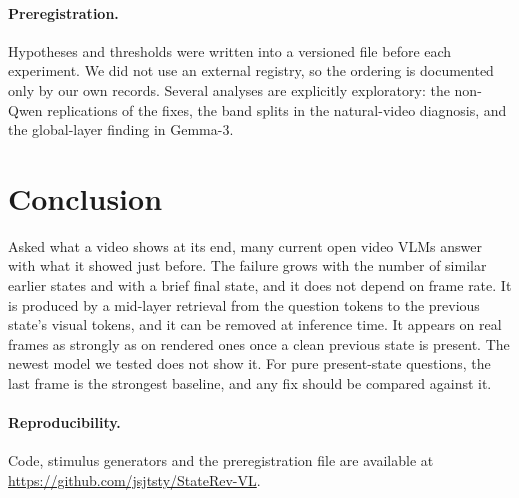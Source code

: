 \documentclass[10pt,twocolumn,letterpaper]{article}
\begin{document}
\paragraph{Preregistration.} Hypotheses and thresholds were written into a versioned file before each experiment. We did not use an external registry, so the ordering is documented only by our own records. Several analyses are explicitly exploratory: the non-Qwen replications of the fixes, the band splits in the natural-video diagnosis, and the global-layer finding in Gemma-3.

\section{Conclusion}

Asked what a video shows at its end, many current open video VLMs answer with what it showed just before. The failure grows with the number of similar earlier states and with a brief final state, and it does not depend on frame rate. It is produced by a mid-layer retrieval from the question tokens to the previous state's visual tokens, and it can be removed at inference time. It appears on real frames as strongly as on rendered ones once a clean previous state is present. The newest model we tested does not show it. For pure present-state questions, the last frame is the strongest baseline, and any fix should be compared against it.

\paragraph{Reproducibility.} Code, stimulus generators and the preregistration file are available at \url{https://github.com/jsjtsty/StateRev-VL}.

{\small


}


\end{document}
